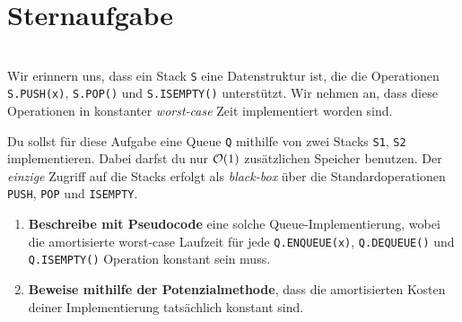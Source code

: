 \documentclass{uebung_cs}
\begin{document}
\section*{Sternaufgabe}

\begin{aufgabe}\mbox{}\\
	Wir erinnern uns, dass ein Stack \texttt{S} eine Datenstruktur ist, die die Operationen \texttt{S.PUSH(x)}, \texttt{S.POP()} und \texttt{S.ISEMPTY()} unterstützt. Wir nehmen an, dass diese Operationen in konstanter \emph{worst-case} Zeit implementiert worden sind.

	Du sollst für diese Aufgabe eine Queue \texttt{Q} mithilfe von zwei Stacks \texttt{S1}, \texttt{S2} implementieren. Dabei darfst du nur $\mathcal{O}(1)$ zusätzlichen Speicher benutzen.
	Der \textit{einzige} Zugriff auf die Stacks erfolgt als \emph{black-box} über die Standardoperationen \texttt{PUSH}, \texttt{POP} und \texttt{ISEMPTY}.
	\begin{enumerate}
		\item 
		\textbf{Beschreibe mit Pseudocode} eine solche Queue-Implementierung, wobei die amortisierte worst-case Laufzeit für jede \texttt{Q.ENQUEUE(x)}, \texttt{Q.DEQUEUE()} und \texttt{Q.ISEMPTY()} Operation konstant sein muss.
		\item
		\textbf{Beweise mithilfe der Potenzialmethode}, dass die amortisierten Kosten deiner Implementierung tatsächlich konstant sind.
	\end{enumerate}
\end{aufgabe}
\end{document}
